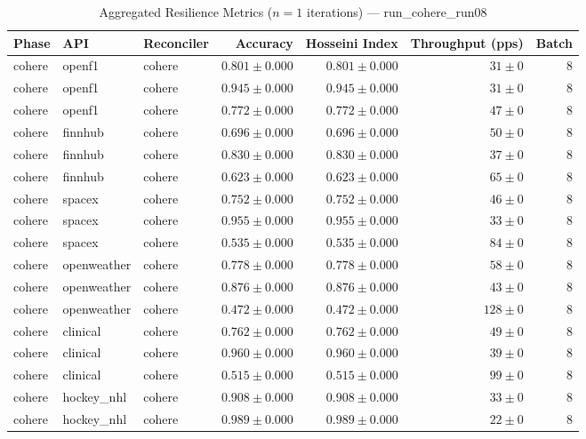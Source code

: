 
\begin{table}[htbp]
\caption{Aggregated Resilience Metrics ($n=1$ iterations) --- run_cohere_run08}
\begin{tabular}{l l l r r r r}
\hline
Phase & API & Reconciler & Accuracy & Hosseini Index & Throughput (pps) & Batch \\
\hline
cohere & openf1 & cohere & $0.801\pm0.000$ & $0.801\pm0.000$ & $31\pm0$ & 8 \\
cohere & openf1 & cohere & $0.945\pm0.000$ & $0.945\pm0.000$ & $31\pm0$ & 8 \\
cohere & openf1 & cohere & $0.772\pm0.000$ & $0.772\pm0.000$ & $47\pm0$ & 8 \\
cohere & finnhub & cohere & $0.696\pm0.000$ & $0.696\pm0.000$ & $50\pm0$ & 8 \\
cohere & finnhub & cohere & $0.830\pm0.000$ & $0.830\pm0.000$ & $37\pm0$ & 8 \\
cohere & finnhub & cohere & $0.623\pm0.000$ & $0.623\pm0.000$ & $65\pm0$ & 8 \\
cohere & spacex & cohere & $0.752\pm0.000$ & $0.752\pm0.000$ & $46\pm0$ & 8 \\
cohere & spacex & cohere & $0.955\pm0.000$ & $0.955\pm0.000$ & $33\pm0$ & 8 \\
cohere & spacex & cohere & $0.535\pm0.000$ & $0.535\pm0.000$ & $84\pm0$ & 8 \\
cohere & openweather & cohere & $0.778\pm0.000$ & $0.778\pm0.000$ & $58\pm0$ & 8 \\
cohere & openweather & cohere & $0.876\pm0.000$ & $0.876\pm0.000$ & $43\pm0$ & 8 \\
cohere & openweather & cohere & $0.472\pm0.000$ & $0.472\pm0.000$ & $128\pm0$ & 8 \\
cohere & clinical & cohere & $0.762\pm0.000$ & $0.762\pm0.000$ & $49\pm0$ & 8 \\
cohere & clinical & cohere & $0.960\pm0.000$ & $0.960\pm0.000$ & $39\pm0$ & 8 \\
cohere & clinical & cohere & $0.515\pm0.000$ & $0.515\pm0.000$ & $99\pm0$ & 8 \\
cohere & hockey\_nhl & cohere & $0.908\pm0.000$ & $0.908\pm0.000$ & $33\pm0$ & 8 \\
cohere & hockey\_nhl & cohere & $0.989\pm0.000$ & $0.989\pm0.000$ & $22\pm0$ & 8 \\

\end{tabular}
\end{table}
